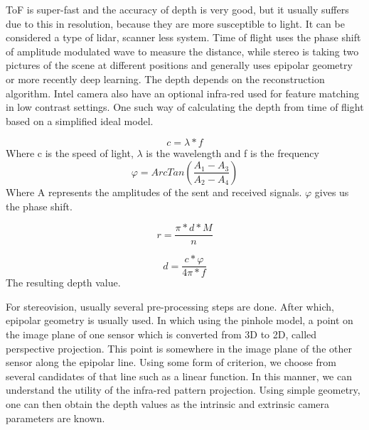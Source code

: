 ToF is super-fast and the accuracy of depth is very good, but it usually suffers due to this in resolution, because they are more susceptible to light. It can be considered a type of lidar, scanner less system. Time of flight uses the phase shift of amplitude modulated wave to measure the distance, while stereo is taking two pictures of the scene at different positions and generally uses epipolar geometry or more recently deep learning. The depth depends on the reconstruction algorithm. Intel camera also have an optional infra-red used for feature matching in low contrast settings. One such way of calculating the depth from time of flight based on a simplified ideal model.

\begin{equation}
c = \lambda * f
\end{equation}
Where c is the speed of light, $\lambda$ is the wavelength and f is the frequency
\begin{equation}
	\varphi = ArcTan(\frac{A_1 - A_3}{A_2 - A_4})
\end{equation}
Where A represents the amplitudes of the sent and received signals. $\varphi$ gives us the phase shift.

\begin{equation}
	r = \frac{\pi * d * M}{n}
\end{equation}

\begin{equation}
	d = \frac{c * \varphi}{4\pi * f}
\end{equation}
The resulting depth value.

For stereovision, usually several pre-processing steps are done. After which, epipolar geometry is usually used. In which using the pinhole model, a point on the image plane of one sensor which is converted from 3D to 2D, called perspective projection. This point is somewhere in the image plane of the other sensor along the epipolar line. Using some form of criterion, we choose from several candidates of that line such as a linear function. In this manner, we can understand the utility of the infra-red pattern projection. Using simple geometry, one can then obtain the depth values as the intrinsic and extrinsic camera parameters are known.
